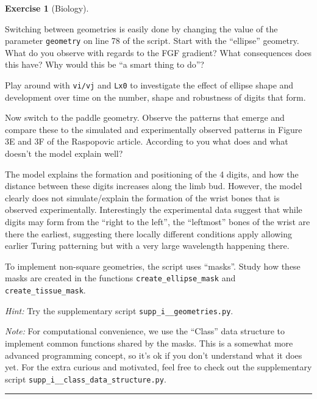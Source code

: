 \documentclass[
  letterpaper,
  DIV=11,
  numbers=noendperiod]{scrreprt}
\theoremstyle{definition}
\newtheorem{exercise}{Exercise}[chapter]
\theoremstyle{remark}
\begin{document}
\begin{exercise}[Biology]\protect\hypertarget{exr-tur}{}\label{exr-tur}

Switching between geometries is easily done by changing the value of the
parameter \texttt{geometry} on line 78 of the script. Start with the
``ellipse'' geometry. What do you observe with regards to the FGF
gradient? What consequences does this have? Why would this be ``a smart
thing to do''?

Play around with \texttt{vi/vj} and \texttt{Lx0} to investigate the
effect of ellipse shape and development over time on the number, shape
and robustness of digits that form.

Now switch to the paddle geometry. Observe the patterns that emerge and
compare these to the simulated and experimentally observed patterns in
Figure 3E and 3F of the Raspopovic article. According to you what does
and what doesn't the model explain well?

The model explains the formation and positioning of the 4 digits, and
how the distance between these digits increases along the limb bud.
However, the model clearly does not simulate/explain the formation of
the wrist bones that is observed experimentally. Interestingly the
experimental data suggest that while digits may form from the ``right to
the left'', the ``leftmost'' bones of the wrist are there the earliest,
suggesting there locally different conditions apply allowing earlier
Turing patterning but with a very large wavelength happening there.

To implement non-square geometries, the script uses ``masks''. Study how
these masks are created in the functions \texttt{create\_ellipse\_mask}
and \texttt{create\_tissue\_mask}.

\emph{Hint:} Try the supplementary script
\texttt{supp\_i\_\_geometries.py}.

\emph{Note:} For computational convenience, we use the ``Class'' data
structure to implement common functions shared by the masks. This is a
somewhat more advanced programming concept, so it's ok if you don't
understand what it does yet. For the extra curious and motivated, feel
free to check out the supplementary script
\texttt{supp\_i\_\_class\_data\_structure.py}.

\end{exercise}

\begin{center}\rule{0.5\linewidth}{0.5pt}\end{center}
\end{document}
